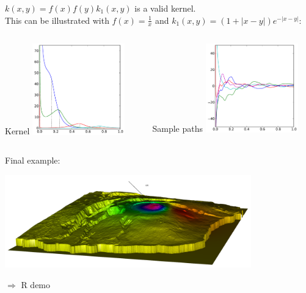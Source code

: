 \documentclass{beamer}
\begin{document}
\begin{frame}{}
\begin{example}
$k(x,y) = f(x)f(y)k_1(x,y)$ is a valid kernel.\\
\vspace{0.5cm}
This can be illustrated with $f(x) = \frac1x$ and $k_1(x,y) = (1 + |x-y|) e^{-|x-y|}$:\\
\begin{columns}[c]
\begin{column}{5cm}
\begin{center}
Kernel
\includegraphics[width=4cm]{figures/python/newfromold-prodfunc-k}
\end{center}
\end{column}
\begin{column}{5cm}
\begin{center}
Sample paths
\includegraphics[width=4cm]{figures/python/newfromold-prodfunc-traj}
\end{center}
\end{column}
\end{columns}
\end{example}
\end{frame}


\begin{frame}{}
\begin{exampleblock}{Final example:}
\begin{center}
\includegraphics[height=4cm]{figures/piton_ulos_2} 
\end{center}
\end{exampleblock}
\alert{$\Rightarrow$ R demo}
\end{frame}
\end{document}
